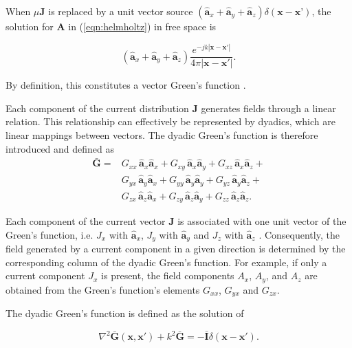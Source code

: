 When $\mu \mathbf{J}$ is replaced by a unit vector source $\left(\mathbf{\hat{a}}_x + \mathbf{\hat{a}}_y + \mathbf{\hat{a}}_z\right)\delta(\mathbf{x}-\mathbf{x’})$, the solution for $\mathbf{A}$ in (\ref{eqn:helmholtz}) in free space is

\begin{equation}\label{eqn:sol_dyadic_green}
	(\mathbf{\hat{a}}_x + \mathbf{\hat{a}}_y + \mathbf{\hat{a}}_z) \frac{e^{-j k |\mathbf{x} - \mathbf{x'}|}}{4\pi |\mathbf{x} - \mathbf{x'}|}.
\end{equation}

By definition, this constitutes a vector Green’s function \cite[pp.~91-92]{Collin_2015}.

Each component of the current distribution $\mathbf{J}$ generates fields through a linear relation. This relationship can effectively be represented by dyadics, which are linear mappings between vectors. The dyadic Green's function is therefore introduced and defined as
\begin{align}
	\nonumber\mathbf{\bar{G}}=&G_{xx}\,\mathbf{\hat{a}}_x\mathbf{\hat{a}}_x+G_{xy}\,\mathbf{\hat{a}}_x\mathbf{\hat{a}}_y + G_{xz}\,\mathbf{\hat{a}}_x\mathbf{\hat{a}}_z+\\\nonumber
	&G_{yx}\,\mathbf{\hat{a}}_y\mathbf{\hat{a}}_x+G_{yy}\,\mathbf{\hat{a}}_y\mathbf{\hat{a}}_y + G_{yz}\,\mathbf{\hat{a}}_y\mathbf{\hat{a}}_z+\\\nonumber
	&G_{zx}\,\mathbf{\hat{a}}_z\mathbf{\hat{a}}_x+G_{zy}\,\mathbf{\hat{a}}_z\mathbf{\hat{a}}_y + G_{zz}\,\mathbf{\hat{a}}_z\mathbf{\hat{a}}_z.
\end{align}

Each component of the current vector $\mathbf{J}$ is associated with one unit vector of the Green's function, i.e. $J_x$ with $\mathbf{\hat{a}}_x$, $J_y$ with $\mathbf{\hat{a}}_y$ and $J_z$ with $\mathbf{\hat{a}}_z$ \cite[p. 92]{Collin_2015}. Consequently, the field generated by a current component in a given direction is determined by the corresponding column of the dyadic Green’s function. For example, if only a current component $J_x$ is present, the field components $A_x$, $A_y$, and $A_z$ are obtained from the Green's function's elements $G_{xx}$, $G_{yx}$ and $G_{zx}$.

The dyadic Green's function is defined as the solution of

\begin{equation}\label{eqn:helmholtz_green}
	\nabla^2 \mathbf{\bar G}(\mathbf{x}, \mathbf{x'}) + k^2 \mathbf{\bar G} = -\mathbf{\bar I} \delta(\mathbf{x} - \mathbf{x'}).
\end{equation}

